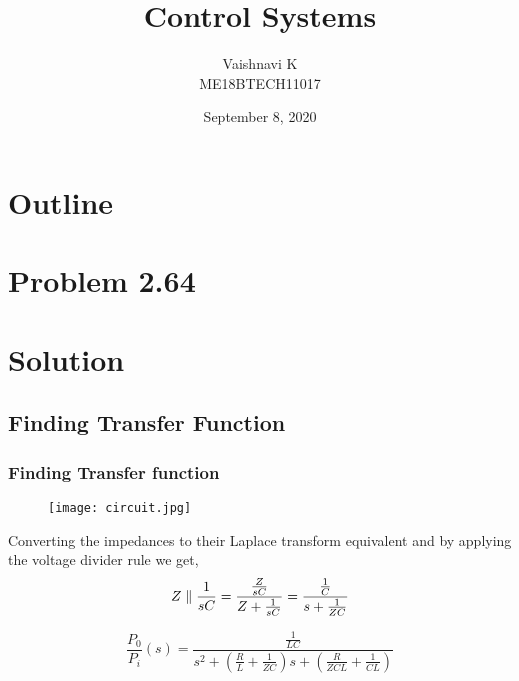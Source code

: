 \documentclass{beamer}
\title{Control Systems}
\author{ Vaishnavi K\\ ME18BTECH11017}
\date{September 8, 2020}
\theoremstyle{remark}
\numberwithin{equation}{section}
\begin{document}
\begin{frame}
\titlepage
\end{frame}

\section*{Outline}
\begin{frame}
\tableofcontents
\end{frame}

\section{Problem 2.64}

\section{Solution}
\subsection{Finding Transfer Function} 
\begin{frame}
\frametitle{Finding Transfer function }
\begin{figure}
\centering
\texttt{[image: circuit.jpg]}
\label{fig:circle_diameter}
\end{figure}
Converting the impedances to their Laplace transform equivalent and by applying the voltage divider rule we get,
\begin{equation} 
\centering
 Z  \parallel \frac{1}{sC} =
\frac{\frac{Z}{sC}}{Z+\frac{1}{sC}} =\frac{\frac{1}{C}}{s + \frac{1}{ZC}}
\end{equation}

\begin{equation}
\frac{P_{0}}{P_{i}} \left ( s\right) = 
\frac{\frac{1}{LC}}{ s^2 + \left( \frac{R}{L} + \frac{1}{ZC}\right)s + \left( \frac{R}{ZCL} + \frac{1}{CL} \right)}
\end{equation}

\end{frame}
\end{document}
